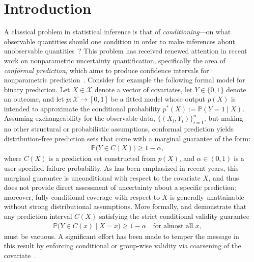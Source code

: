 \documentclass[11pt]{article}
\theoremstyle{statplain}
\theoremstyle{statdefinition}
\newcommand{\PP}{\mathbb{P}}
\newcommand{\0}{\mathbf{0}}
\begin{document}
\newpage
\section{Introduction}

A classical problem in statistical inference is that of
\emph{conditioning}---on what observable quantities should one condition in order to make inferences about unobservable quantities~\citep{fisher1934statistical,cox1958some,  cox1988some, reid1995}? 
This problem has received renewed attention in recent work on nonparametric uncertainty quantification,
specifically the area of \emph{conformal prediction}, which aims to produce confidence intervals for nonparametric prediction~\citep{vovk2005algorithmic,shafer2008tutorial}. Consider for example the following formal model for binary prediction. Let $X\in\mathcal{X}$ denote a vector of covariates, let $Y\in\{0,1\}$ denote an outcome, and let $p:\mathcal{X}\to[0,1]$ be a fitted model whose output $p(X)$ is intended to approximate the conditional probability $p^*(X):=\PP(Y=1\mid X)$. Assuming exchangeability for the observable data, $\{(X_i, Y_i)\}_{i=1}^n$, but making no other structural or probabilistic assumptions, conformal prediction yields distribution-free prediction sets that come with a marginal guarantee of the form:
\begin{align}\label{eq:intro_conformal_marginal}
\PP\Big(Y\in C(X)\Big)\ge 1-\alpha,
\end{align}
where $C(X)$ is a prediction set constructed from $p(X)$, and $\alpha \in (0,1)$ is a user-specified failure probability. As has been emphasized in recent years, this marginal guarantee is unconditional with respect to the covariate $X$, and thus does not provide direct assessment of uncertainty about a specific prediction; moreover, fully conditional coverage with respect to $X$ is generally unattainable without strong distributional assumptions.  More formally,
\citet{lei2014distribution} and \citet{barber2021limits} demonstrate that any prediction interval $C(X)$ satisfying the strict conditional validity guarantee
\begin{align}\label{eq:conditional_conformal}
    \PP\Big(Y \in C(x)\mid X=x\Big) \geq 1-\alpha \quad \text{for almost all } x,
\end{align}
must be vacuous.  A significant effort has been made to temper the message in this result by enforcing conditional or group-wise validity via coarsening of the covariate~\citep{ding2023class, martinezgil2024groups, gibbs2025conformal,duchi2025few}. 
\end{document}
